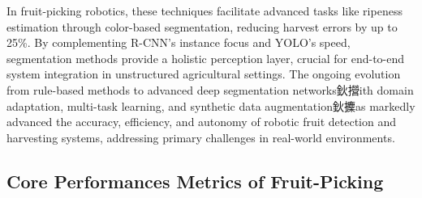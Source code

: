 \documentclass[a4paper,fleqn]{cas-dc}
\begin{document}
In fruit-picking robotics, these techniques facilitate advanced tasks like ripeness estimation through color-based segmentation, reducing harvest errors by up to 25\%. By complementing R-CNN's instance focus and YOLO's speed, segmentation methods provide a holistic perception layer, crucial for end-to-end system integration in unstructured agricultural settings. 
The ongoing evolution from rule-based methods to advanced deep segmentation networks鈥攚ith domain adaptation, multi-task learning, and synthetic data augmentation鈥攈as markedly advanced the accuracy, efficiency, and autonomy of robotic fruit detection and harvesting systems, addressing primary challenges in real-world environments.

\subsection{Core Performances Metrics of Fruit-Picking}
\end{document}
